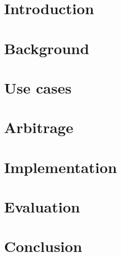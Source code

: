 


\begin{abstract}
    
\end{abstract}

\section{Introduction}\label{intro}


\section{Background}\label{back}


\section{Use cases}\label{use}


\section{Arbitrage}\label{arb}


\section{Implementation}\label{imp}


\section{Evaluation}\label{eval}


\section{Conclusion}\label{con}


\newpage
\printbibliography

